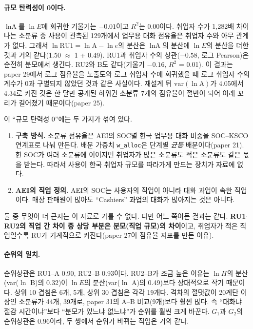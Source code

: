 \documentclass[11pt]{article}
\begin{document}
\paragraph{규모 탄력성이 0이다.} $\ln \text{A}$를 $\ln E$에 회귀한 기울기는 $-0.01$이고 $R^2$는 0.00이다. 취업자 수가 1,282배 차이 나는 소분류 중 사용이 관측된 129개에서 업무용 대화 점유율은 취업자 수와 아무 관계가 없다. 그래서 $\ln \mathrm{RU1} = \ln \text{A} - \ln e$의 분산은 $\ln \text{A}$의 분산에 $\ln E$의 분산을 더한 것과 거의 같다(1.50 $\approx$ 1 + 0.49). RU1과 취업자 수의 상관($-0.58$, 로그 Pearson)은 순전히 분모에서 생긴다. RU2와 B도 같다(기울기 $-0.16$, $R^2$ = 0.01). 이 결과는 paper 29에서 로그 점유율을 노출도와 로그 취업자 수에 회귀했을 때 로그 취업자 수의 계수가 0과 구별되지 않았던 것과 같은 사실이다. 재설계 뒤 $\mathrm{var}(\ln \text{A})$가 4.05에서 4.34로 커진 것은 한 달만 공개된 하위권 소분류 7개의 점유율이 절반이 되어 아래 꼬리가 길어졌기 때문이다(paper 25).

이 ``규모 탄력성 0''에는 두 가지가 섞여 있다.
\begin{enumerate}[leftmargin=*]
  \item \textbf{구축 방식.} 소분류 점유율은 AEI의 SOC별 한국 업무용 대화 비중을 SOC--KSCO 연계표로 나눠 만든다. 배분 가중치 \texttt{w\_alloc}은 단계별 \emph{균등} 배분이다(paper 21). 한 SOC가 여러 소분류에 이어지면 취업자가 많은 소분류도 적은 소분류도 같은 몫을 받는다. 따라서 사용이 한국 취업자 규모를 따라가게 만드는 장치가 자료에 없다.
  \item \textbf{AEI의 직업 정의.} AEI의 SOC는 사용자의 직업이 아니라 대화 과업이 속한 직업이다. 매장 판매원이 많아도 ``Cashiers'' 과업의 대화가 많아지는 것은 아니다.
\end{enumerate}
둘 중 무엇이 더 큰지는 이 자료로 가를 수 없다. 다만 어느 쪽이든 결과는 같다. \textbf{RU1$\cdot$RU2의 직업 간 차이 중 상당 부분은 분모(직업 규모)의 차이}이고, 취업자가 적은 직업일수록 RU가 기계적으로 커진다(paper 27이 점유율 지표를 만든 이유).

\paragraph{순위의 일치.} 순위상관은 RU1--A 0.90, RU2--B 0.93이다. RU2--B가 조금 높은 이유는 $\ln H$의 분산(var($\ln$ B)의 0.32)이 $\ln E$의 분산(var($\ln$ A)의 0.49)보다 상대적으로 작기 때문이다. 상위 10 겹침은 6개, 5개, 상위 30 겹침은 각각 19개다. 격차의 절댓값이 20계단 이상인 소분류가 44개, 39개로, paper 31의 A--B 비교(9개)보다 훨씬 많다. 즉 ``대화냐 절감 시간이냐''보다 ``분모가 있느냐 없느냐''가 순위를 훨씬 크게 바꾼다. $G_1$과 $G_2$의 순위상관은 0.96이라, 두 쌍에서 순위가 바뀌는 직업은 거의 같다.
\end{document}
